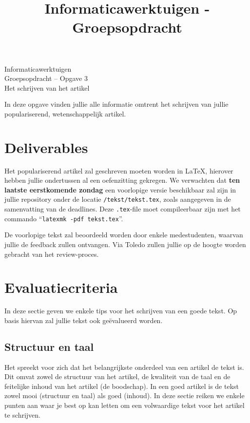 \documentclass[a4paper]{article}
\title{Informaticawerktuigen - Groepsopdracht}
\begin{document}
\begin{center}
  \huge Informaticawerktuigen \\
  \Huge Groepsopdracht -- Opgave 3 \\
  \huge Het schrijven van het artikel
\end{center}
\vspace{1em}

In deze opgave vinden jullie alle informatie omtrent het schrijven van jullie populariserend, wetenschappelijk artikel.


\section{Deliverables}

Het populariserend artikel zal geschreven moeten worden in \LaTeX{}, hierover hebben jullie ondertussen al een oefenzitting gekregen.
We verwachten dat \textbf{ten laatste eerstkomende zondag} een voorlopige versie beschikbaar zal zijn in jullie repository onder de locatie \texttt{/tekst/tekst.tex}, zoals aangegeven in de samenvatting van de deadlines.
Deze \texttt{.tex}-file moet compileerbaar zijn met het commando ``\texttt{latexmk -pdf tekst.tex}''.

De voorlopige tekst zal beoordeeld worden door enkele medestudenten, waarvan jullie de feedback zullen ontvangen.
Via Toledo zullen jullie op de hoogte worden gebracht van het review-proces.


\section{Evaluatiecriteria}

In deze sectie geven we enkele tips voor het schrijven van een goede tekst.
Op basis hiervan zal jullie tekst ook ge\"evalueerd worden.


\subsection{Structuur en taal}

Het spreekt voor zich dat het belangrijkste onderdeel van een artikel de tekst is.
Dit omvat zowel de structuur van het artikel, de kwaliteit van de taal en de feitelijke inhoud van het artikel (de boodschap).
In een goed artikel is de tekst zowel mooi (structuur en taal) als goed (inhoud).
In deze sectie reiken we enkele punten aan waar je best op kan letten om een volwaardige tekst voor het artikel te schrijven.
\end{document}
